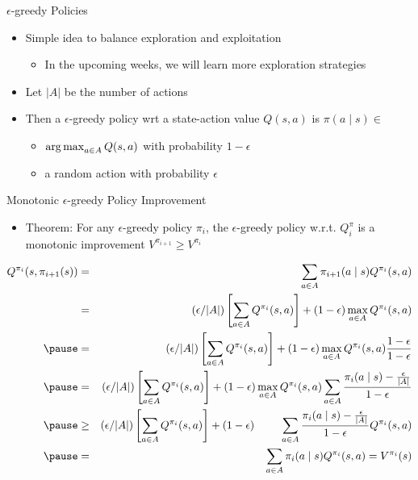 \documentclass[aspectratio=169]{../latex_main/tntbeamer}  %
\begin{document}
\begin{frame}[c]{$\epsilon$-greedy Policies}
	
	\begin{itemize}
	\item Simple idea to balance exploration and exploitation
	\begin{itemize}
	    \item In the upcoming weeks, we will learn more exploration strategies
	\end{itemize}
	\item Let $|A|$ be the number of actions
	\item Then a $\epsilon$-greedy policy wrt a state-action value $Q(s,a)$ is $\pi(a\mid s) \in $
	\begin{itemize}
		\item $\operatorname*{arg\,max}_{a\in A} Q(s,a)$ with probability $1 - \epsilon$
		\item a random action with probability $\epsilon$
	\end{itemize}
\end{itemize}
	
\end{frame}
\begin{frame}[c]{Monotonic $\epsilon$-greedy Policy Improvement}
	\vspace{-1em}
	\begin{itemize}
		\item Theorem: For any $\epsilon$-greedy policy $\pi_i$, the $\epsilon$-greedy policy w.r.t. $Q^{\pi}_i$ is a monotonic improvement $V^{\pi_{i+1}} \geq V^{\pi_i}$
	\end{itemize}

\footnotesize
	\vspace{-1em}
\begin{eqnarray}
Q^{\pi_i} (s,\pi_{i+1} (s)) &=& \sum_{a \in A} \pi_{i+1}(a \mid s) Q^{\pi_{i}}(s,a)\nonumber\\
	&=& (\epsilon / |A|) \left[\sum_{a\in A} Q^{\pi_{i}}(s,a) \right] + (1- \epsilon) \max_{a\in A} Q^{\pi_{i}}(s,a)\nonumber\\ \pause
	&=& (\epsilon / |A|) \left[\sum_{a\in A} Q^{\pi_{i}}(s,a) \right] + (1- \epsilon) \max_{a\in A} Q^{\pi_{i}}(s,a)\frac{1-\epsilon}{1-\epsilon}\nonumber\\ \pause
	&=& (\epsilon / |A|) \left[\sum_{a\in A} Q^{\pi_{i}}(s,a) \right] + (1- \epsilon) \max_{a\in A} Q^{\pi_{i}}(s,a)\sum_{a\in A}\frac{\pi_i(a\mid s) - \frac{\epsilon}{|A|}}{1-\epsilon}\nonumber\\ \pause
	&\geq& (\epsilon / |A|) \left[\sum_{a\in A} Q^{\pi_{i}}(s,a) \right] + (1- \epsilon) \qquad~ \sum_{a\in A}\frac{\pi_i(a\mid s) - \frac{\epsilon}{|A|}}{1-\epsilon} Q^{\pi_{i}}(s,a) \nonumber\\ \pause
	&=& \sum_{a\in A} \pi_i (a \mid s) Q^{\pi_i}(s,a) = V^{\pi_i}(s)\nonumber
\end{eqnarray}
	
\end{frame}
\end{document}
